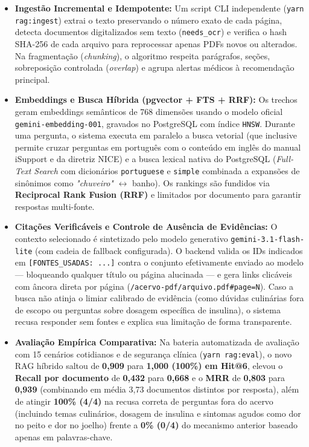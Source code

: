 \documentclass[11pt,a4paper]{article}
\begin{document}
\begin{itemize}[leftmargin=1.25cm, label=\textbullet, topsep=2pt, itemsep=5pt]
  \item \textbf{Ingestão Incremental e Idempotente:} Um script CLI independente (\texttt{yarn rag:ingest}) extrai o texto preservando o número exato de cada página, detecta documentos digitalizados sem texto (\texttt{needs\_ocr}) e verifica o hash SHA-256 de cada arquivo para reprocessar apenas PDFs novos ou alterados. Na fragmentação (\textit{chunking}), o algoritmo respeita parágrafos, seções, sobreposição controlada (\textit{overlap}) e agrupa alertas médicos à recomendação principal.
  \item \textbf{Embeddings e Busca Híbrida (pgvector + FTS + RRF):} Os trechos geram embeddings semânticos de 768 dimensões usando o modelo oficial \texttt{gemini-embedding-001}, gravados no PostgreSQL com índice \texttt{HNSW}. Durante uma pergunta, o sistema executa em paralelo a busca vetorial (que inclusive permite cruzar perguntas em português com o conteúdo em inglês do manual iSupport e da diretriz NICE) e a busca lexical nativa do PostgreSQL (\textit{Full-Text Search} com dicionários \texttt{portuguese} e \texttt{simple} combinada a expansões de sinônimos como \textit{"chuveiro"} $\leftrightarrow$ banho). Os rankings são fundidos via \textbf{Reciprocal Rank Fusion (RRF)} e limitados por documento para garantir respostas multi-fonte.
  \item \textbf{Citações Verificáveis e Controle de Ausência de Evidências:} O contexto selecionado é sintetizado pelo modelo generativo \texttt{gemini-3.1-flash-lite} (com cadeia de fallback configurada). O backend valida os IDs indicados em \texttt{[FONTES\_USADAS: ...]} contra o conjunto efetivamente enviado ao modelo — bloqueando qualquer título ou página alucinada — e gera links clicáveis com âncora direta por página (\texttt{/acervo-pdf/arquivo.pdf\#page=N}). Caso a busca não atinja o limiar calibrado de evidência (como dúvidas culinárias fora de escopo ou perguntas sobre dosagem específica de insulina), o sistema recusa responder sem fontes e explica sua limitação de forma transparente.
  \item \textbf{Avaliação Empírica Comparativa:} Na bateria automatizada de avaliação com 15 cenários cotidianos e de segurança clínica (\texttt{yarn rag:eval}), o novo RAG híbrido saltou de \textbf{0,909} para \textbf{1,000 (100\%) em Hit@6}, elevou o \textbf{Recall por documento} de \textbf{0,432} para \textbf{0,668} e o \textbf{MRR} de \textbf{0,803} para \textbf{0,939} (combinando em média 3,73 documentos distintos por resposta), além de atingir \textbf{100\% (4/4)} na recusa correta de perguntas fora do acervo (incluindo temas culinários, dosagem de insulina e sintomas agudos como dor no peito e dor no joelho) frente a \textbf{0\% (0/4)} do mecanismo anterior baseado apenas em palavras-chave.
\end{itemize}
\end{document}
